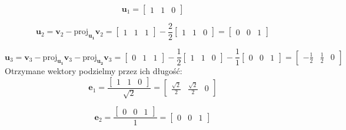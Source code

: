 \documentclass[main.tex]{subfiles}
\begin{document}
    \[
        \mathbf{u}_1 =
        \begin{bmatrix}
            1 & 1 & 0
        \end{bmatrix}
    \]

    \[
        \mathbf{u}_2 =  \mathbf{v}_2 - \mathrm{proj}_\mathbf{u_1} \mathbf{v}_2 = \begin{bmatrix}
                                                                                     1 & 1 & 1
        \end{bmatrix}
        -
        \frac{2}{2}
        \begin{bmatrix}
            1 & 1 & 0
        \end{bmatrix}
        =
        \begin{bmatrix}
            0 & 0 & 1
        \end{bmatrix}
    \]

    \[
        \mathbf{u}_3 =  \mathbf{v}_3 - \mathrm{proj}_\mathbf{u_1} \mathbf{v}_3 - \mathrm{proj}_\mathbf{u_2} \mathbf{v}_3=
        \begin{bmatrix}
            0 & 1 & 1
        \end{bmatrix}
        -
        \frac{1}{2}
        \begin{bmatrix}
            1 & 1 & 0
        \end{bmatrix}
        -
        \frac{1}{1}
        \begin{bmatrix}
            0 & 0 & 1
        \end{bmatrix}
        =
        \begin{bmatrix}
            -\frac{1}{2} & \frac{1}{2} & 0
        \end{bmatrix}
    \]
    Otrzymane wektory podzielmy przez ich długość:
    \[
        \mathbf{e}_1 =
        \frac
        {\begin{bmatrix}
             1 & 1 & 0
        \end{bmatrix}}
        {\sqrt{2}}
        =
        \begin{bmatrix}
            \frac{\sqrt{2}}{2} & \frac{\sqrt{2}}{2} & 0
        \end{bmatrix}
    \]

    \[
        \mathbf{e}_2 =
        \frac
        {\begin{bmatrix}
             0 & 0 & 1
        \end{bmatrix}}
        {1}
        =
        \begin{bmatrix}
            0 & 0 & 1
        \end{bmatrix}
    \]
\end{document}
